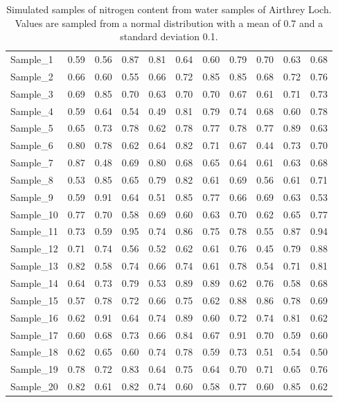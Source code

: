 \documentclass[
  openany]{scrbook}
\begin{document}
\begin{longtable}[]{@{}lrrrrrrrrrr@{}}
\caption{\label{tab:unnamed-chunk-40}Simulated samples of nitrogen content from water samples of Airthrey Loch. Values are sampled from a normal distribution with a mean of 0.7 and a standard deviation 0.1.}\tabularnewline
\toprule
\endhead
Sample\_1 & 0.59 & 0.56 & 0.87 & 0.81 & 0.64 & 0.60 & 0.79 & 0.70 & 0.63 & 0.68 \\
Sample\_2 & 0.66 & 0.60 & 0.55 & 0.66 & 0.72 & 0.85 & 0.85 & 0.68 & 0.72 & 0.76 \\
Sample\_3 & 0.69 & 0.85 & 0.70 & 0.63 & 0.70 & 0.70 & 0.67 & 0.61 & 0.71 & 0.73 \\
Sample\_4 & 0.59 & 0.64 & 0.54 & 0.49 & 0.81 & 0.79 & 0.74 & 0.68 & 0.60 & 0.78 \\
Sample\_5 & 0.65 & 0.73 & 0.78 & 0.62 & 0.78 & 0.77 & 0.78 & 0.77 & 0.89 & 0.63 \\
Sample\_6 & 0.80 & 0.78 & 0.62 & 0.64 & 0.82 & 0.71 & 0.67 & 0.44 & 0.73 & 0.70 \\
Sample\_7 & 0.87 & 0.48 & 0.69 & 0.80 & 0.68 & 0.65 & 0.64 & 0.61 & 0.63 & 0.68 \\
Sample\_8 & 0.53 & 0.85 & 0.65 & 0.79 & 0.82 & 0.61 & 0.69 & 0.56 & 0.61 & 0.71 \\
Sample\_9 & 0.59 & 0.91 & 0.64 & 0.51 & 0.85 & 0.77 & 0.66 & 0.69 & 0.63 & 0.53 \\
Sample\_10 & 0.77 & 0.70 & 0.58 & 0.69 & 0.60 & 0.63 & 0.70 & 0.62 & 0.65 & 0.77 \\
Sample\_11 & 0.73 & 0.59 & 0.95 & 0.74 & 0.86 & 0.75 & 0.78 & 0.55 & 0.87 & 0.94 \\
Sample\_12 & 0.71 & 0.74 & 0.56 & 0.52 & 0.62 & 0.61 & 0.76 & 0.45 & 0.79 & 0.88 \\
Sample\_13 & 0.82 & 0.58 & 0.74 & 0.66 & 0.74 & 0.61 & 0.78 & 0.54 & 0.71 & 0.81 \\
Sample\_14 & 0.64 & 0.73 & 0.79 & 0.53 & 0.89 & 0.89 & 0.62 & 0.76 & 0.58 & 0.68 \\
Sample\_15 & 0.57 & 0.78 & 0.72 & 0.66 & 0.75 & 0.62 & 0.88 & 0.86 & 0.78 & 0.69 \\
Sample\_16 & 0.62 & 0.91 & 0.64 & 0.74 & 0.89 & 0.60 & 0.72 & 0.74 & 0.81 & 0.62 \\
Sample\_17 & 0.60 & 0.68 & 0.73 & 0.66 & 0.84 & 0.67 & 0.91 & 0.70 & 0.59 & 0.60 \\
Sample\_18 & 0.62 & 0.65 & 0.60 & 0.74 & 0.78 & 0.59 & 0.73 & 0.51 & 0.54 & 0.50 \\
Sample\_19 & 0.78 & 0.72 & 0.83 & 0.64 & 0.75 & 0.64 & 0.70 & 0.71 & 0.65 & 0.76 \\
Sample\_20 & 0.82 & 0.61 & 0.82 & 0.74 & 0.60 & 0.58 & 0.77 & 0.60 & 0.85 & 0.62 \\
\bottomrule
\end{longtable}
\end{document}
